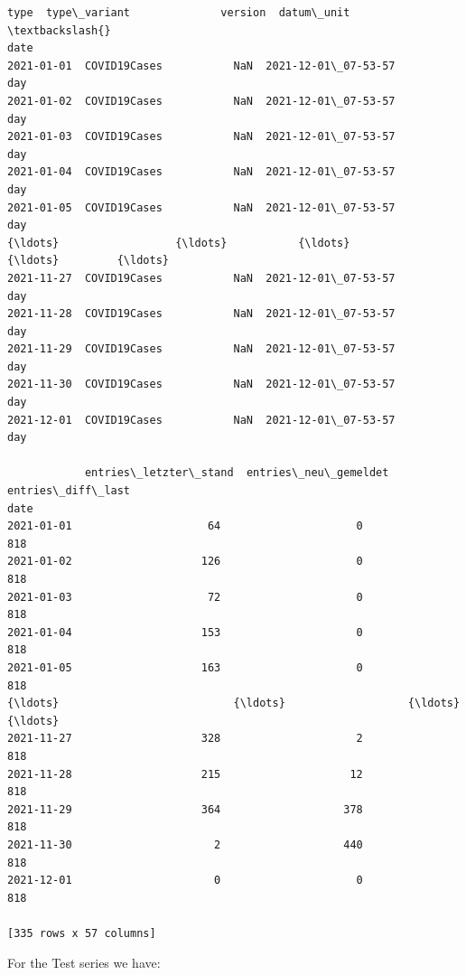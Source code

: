 \documentclass[11pt]{article}
\begin{document}
\begin{tcolorbox}[breakable, size=fbox, boxrule=.5pt, pad at break*=1mm, opacityfill=0]
\begin{Verbatim}[commandchars=\\\{\}]
                    type  type\_variant              version  datum\_unit  \textbackslash{}
date
2021-01-01  COVID19Cases           NaN  2021-12-01\_07-53-57         day
2021-01-02  COVID19Cases           NaN  2021-12-01\_07-53-57         day
2021-01-03  COVID19Cases           NaN  2021-12-01\_07-53-57         day
2021-01-04  COVID19Cases           NaN  2021-12-01\_07-53-57         day
2021-01-05  COVID19Cases           NaN  2021-12-01\_07-53-57         day
{\ldots}                  {\ldots}           {\ldots}                  {\ldots}         {\ldots}
2021-11-27  COVID19Cases           NaN  2021-12-01\_07-53-57         day
2021-11-28  COVID19Cases           NaN  2021-12-01\_07-53-57         day
2021-11-29  COVID19Cases           NaN  2021-12-01\_07-53-57         day
2021-11-30  COVID19Cases           NaN  2021-12-01\_07-53-57         day
2021-12-01  COVID19Cases           NaN  2021-12-01\_07-53-57         day

            entries\_letzter\_stand  entries\_neu\_gemeldet  entries\_diff\_last
date
2021-01-01                     64                     0                818
2021-01-02                    126                     0                818
2021-01-03                     72                     0                818
2021-01-04                    153                     0                818
2021-01-05                    163                     0                818
{\ldots}                           {\ldots}                   {\ldots}                {\ldots}
2021-11-27                    328                     2                818
2021-11-28                    215                    12                818
2021-11-29                    364                   378                818
2021-11-30                      2                   440                818
2021-12-01                      0                     0                818

[335 rows x 57 columns]
\end{Verbatim}
\end{tcolorbox}
        
    For the Test series we have:
\end{document}
